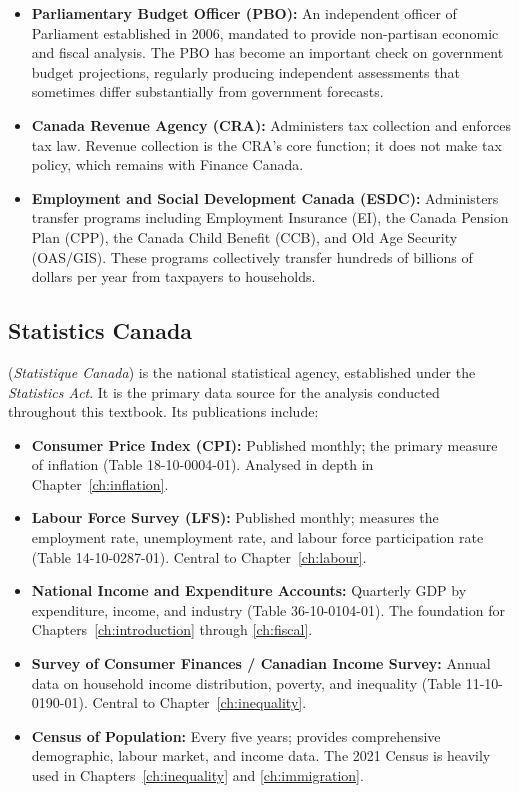 \begin{itemize}
  \item \textbf{Parliamentary Budget Officer (PBO):} An independent officer
        of Parliament established in 2006, mandated to provide non-partisan
        economic and fiscal analysis. The PBO has become an important check
        on government budget projections, regularly producing independent
        assessments that sometimes differ substantially from government
        forecasts.
  \item \textbf{Canada Revenue Agency (CRA):} Administers tax collection
        and enforces tax law. Revenue collection is the CRA's core function;
        it does not make tax policy, which remains with Finance Canada.
  \item \textbf{Employment and Social Development Canada (ESDC):} Administers
        transfer programs including Employment Insurance (EI), the Canada
        Pension Plan (CPP), the Canada Child Benefit (CCB), and Old Age
        Security (OAS/GIS). These programs collectively transfer hundreds
        of billions of dollars per year from taxpayers to households.
\end{itemize}

\subsection{Statistics Canada}

 (\textit{Statistique Canada}) is the national
statistical agency, established under the \textit{Statistics Act}. It
is the primary data source for the analysis conducted throughout this
textbook. Its publications include:

\begin{itemize}
  \item \textbf{Consumer Price Index (CPI):} Published monthly; the primary
        measure of inflation (Table 18-10-0004-01). Analysed in depth in
        Chapter~\ref{ch:inflation}.
  \item \textbf{Labour Force Survey (LFS):} Published monthly; measures the
        employment rate, unemployment rate, and labour force participation
        rate (Table 14-10-0287-01). Central to Chapter~\ref{ch:labour}.
  \item \textbf{National Income and Expenditure Accounts:} Quarterly GDP by
        expenditure, income, and industry (Table 36-10-0104-01). The
        foundation for Chapters~\ref{ch:introduction} through \ref{ch:fiscal}.
  \item \textbf{Survey of Consumer Finances / Canadian Income Survey:}
        Annual data on household income distribution, poverty, and inequality
        (Table 11-10-0190-01). Central to Chapter~\ref{ch:inequality}.
  \item \textbf{Census of Population:} Every five years; provides
        comprehensive demographic, labour market, and income data. The 2021
        Census is heavily used in Chapters~\ref{ch:inequality}
        and \ref{ch:immigration}.
\end{itemize}

